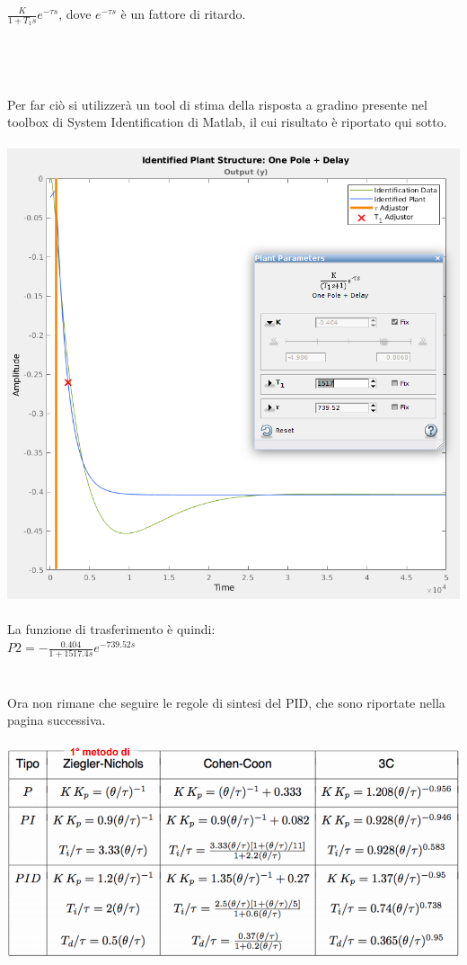 \documentclass[Lau,noexaminfo]{sapthesis}
\begin{document}
 	$\frac{K}{1+T_1 s} e^{-\tau s}$, dove $e^{-\tau s}$ è un fattore di ritardo.\\\\\\\\\\Per far ciò si utilizzerà un tool di stima della risposta a gradino presente nel toolbox di System Identification di Matlab, il cui risultato è riportato qui sotto.\\\\
 	\includegraphics[scale=0.5]{P2_estimating1}\\\\
	La funzione di trasferimento è quindi:\\
	$P2=-\frac{0.404}{1+1517.4s}e^{-739.52s}$\\\\\\
	Ora non rimane che seguire le regole di sintesi del PID, che sono riportate nella pagina successiva.\\\\
	\includegraphics[height=0.27\textheight,]{Regole_PID}\\\\\\
\end{document}
